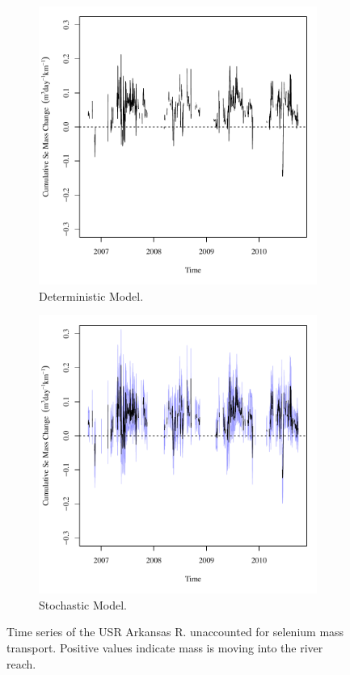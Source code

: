 \begin{linenumbers}
\begin{figure}[htbp]
\centering
	\begin{subfigure}{0.5\textwidth}
		\centering
		\includegraphics[width=0.9\linewidth]{"Figures/Results_DUSR/Balance Mass"}
		\caption{Deterministic Model.}
		\label{sub:USRMassD}
	\end{subfigure}%
	\begin{subfigure}{0.5\textwidth}
		\centering
		\includegraphics[width=0.9\linewidth]{"Figures/Results_USR/Balance Mass"}
		\caption{Stochastic Model.}
		\label{sub:USRMassS}
	\end{subfigure}
	\caption[Time series of the USR Arkansas R. unaccounted for selenium mass transport.]{Time series of the USR Arkansas R. unaccounted for selenium mass transport.  Positive values indicate mass is moving into the river reach.}
	\label{fig:USRMass}
\end{figure}


\end{linenumbers}
